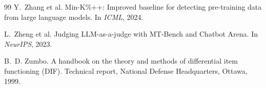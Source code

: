 \documentclass[11pt,a4paper]{article}
\begin{document}
\begin{thebibliography}{99}
Y.~Zhang et al.
\newblock Min-K\%++: Improved baseline for detecting pre-training data from large language models.
\newblock In \emph{ICML}, 2024.

L.~Zheng et al.
\newblock Judging LLM-as-a-judge with MT-Bench and Chatbot Arena.
\newblock In \emph{NeurIPS}, 2023.

B.~D. Zumbo.
\newblock A handbook on the theory and methods of differential item functioning (DIF).
\newblock Technical report, National Defense Headquarters, Ottawa, 1999.

\end{thebibliography}
\end{document}
